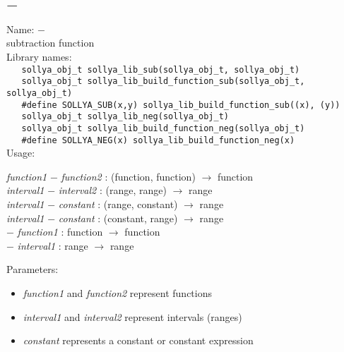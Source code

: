 \subsection{$-$}
\label{labminus}
\noindent Name: \textbf{$-$}\\
\phantom{aaa}subtraction function\\[0.2cm]
\noindent Library names:\\
\verb|   sollya_obj_t sollya_lib_sub(sollya_obj_t, sollya_obj_t)|\\
\verb|   sollya_obj_t sollya_lib_build_function_sub(sollya_obj_t, sollya_obj_t)|\\
\verb|   #define SOLLYA_SUB(x,y) sollya_lib_build_function_sub((x), (y))|\\
\verb|   sollya_obj_t sollya_lib_neg(sollya_obj_t)|\\
\verb|   sollya_obj_t sollya_lib_build_function_neg(sollya_obj_t)|\\
\verb|   #define SOLLYA_NEG(x) sollya_lib_build_function_neg(x)|\\[0.2cm]
\noindent Usage: 
\begin{center}
\emph{function1} \textbf{$-$} \emph{function2} : (\textsf{function}, \textsf{function}) $\rightarrow$ \textsf{function}\\
\emph{interval1} \textbf{$-$} \emph{interval2} : (\textsf{range}, \textsf{range}) $\rightarrow$ \textsf{range}\\
\emph{interval1} \textbf{$-$} \emph{constant} : (\textsf{range}, \textsf{constant}) $\rightarrow$ \textsf{range}\\
\emph{interval1} \textbf{$-$} \emph{constant} : (\textsf{constant}, \textsf{range}) $\rightarrow$ \textsf{range}\\
\textbf{$-$} \emph{function1} : \textsf{function} $\rightarrow$ \textsf{function}\\
\textbf{$-$} \emph{interval1} : \textsf{range} $\rightarrow$ \textsf{range}\\
\end{center}
Parameters: 
\begin{itemize}
\item \emph{function1} and \emph{function2} represent functions
\item \emph{interval1} and \emph{interval2} represent intervals (ranges)
\item \emph{constant} represents a constant or constant expression
\end{itemize}
